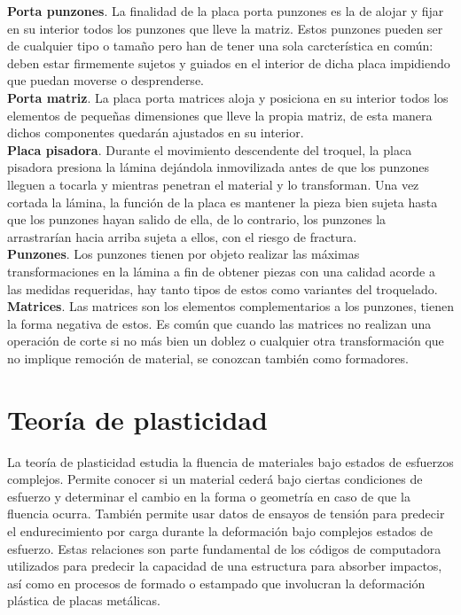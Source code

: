 \textbf{Porta punzones}. La finalidad de la placa porta punzones es la de alojar y fijar en 
su interior todos los punzones que lleve la matriz. Estos punzones pueden ser de cualquier 
tipo o tamaño pero han de tener una sola carcterística en común: deben estar firmemente 
sujetos y guiados en el interior de dicha placa impidiendo que puedan moverse o desprenderse.\\

\textbf{Porta matriz}. La placa porta matrices aloja y posiciona en su interior todos 
los elementos de pequeñas dimensiones que lleve la propia matriz, de esta manera dichos componentes 
quedarán ajustados en su interior.\\

\textbf{Placa pisadora}. Durante el movimiento descendente del troquel, la placa pisadora presiona 
la lámina dejándola inmovilizada antes de que los punzones lleguen a tocarla y mientras penetran 
el material y lo transforman. Una vez cortada la lámina, la función de la placa es mantener la 
pieza bien sujeta hasta que los punzones hayan salido de ella, de lo contrario, los punzones 
la arrastrarían hacia arriba sujeta a ellos, con el riesgo de fractura.\\

\textbf{Punzones}. Los punzones tienen por objeto realizar las máximas transformaciones en la lámina 
a fin de obtener piezas con una calidad acorde a las medidas requeridas, hay tanto tipos de estos 
como variantes del troquelado.\\

\textbf{Matrices}. Las matrices son los elementos complementarios a los punzones, tienen la forma 
negativa de estos. Es común que cuando las matrices no realizan una operación de corte si no más 
bien un doblez o cualquier otra transformación que no implique remoción de material, se conozcan 
también como formadores.


\section{Teoría de plasticidad}

La teoría de plasticidad estudia la fluencia de materiales bajo estados de esfuerzos complejos. Permite 
conocer si un material cederá bajo ciertas condiciones de esfuerzo y determinar el cambio en la forma o 
geometría en caso de que la fluencia ocurra. También permite usar datos de ensayos de tensión para predecir 
el endurecimiento por carga durante la deformación bajo complejos estados de esfuerzo. Estas relaciones 
son parte fundamental de los códigos de computadora utilizados para predecir la capacidad de una estructura 
para absorber impactos, así como en procesos de formado o estampado que involucran la deformación plástica de 
placas metálicas. ~\cite{hosford2005}

